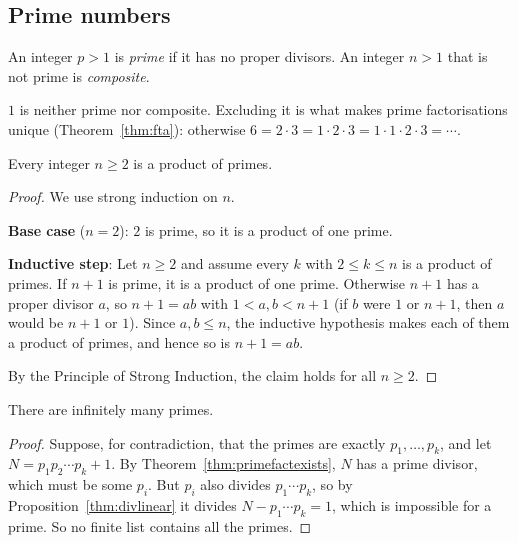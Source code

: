 \subsection{Prime numbers}
\label{sec:7-2}

\begin{definition}
An integer $p>1$ is \emph{prime} if it has no proper divisors. An integer $n>1$ that is not prime is \emph{composite}.
\end{definition}

\begin{note}[$1$ is neither]
$1$ is neither prime nor composite. Excluding it is what makes prime factorisations unique (Theorem~\ref{thm:fta}): otherwise $6=2\cdot3=1\cdot2\cdot3=1\cdot1\cdot2\cdot3=\cdots$.
\end{note}

\begin{theorem}
\label{thm:primefactexists}
Every integer $n\ge2$ is a product of primes.
\end{theorem}
\begin{proof}
We use strong induction on $n$.

\textbf{Base case} ($n=2$): $2$ is prime, so it is a product of one prime.

\textbf{Inductive step}: Let $n\ge2$ and assume every $k$ with $2\le k\le n$ is a product of primes. If $n+1$ is prime, it is a product of one prime. Otherwise $n+1$ has a proper divisor $a$, so $n+1=ab$ with $1<a,b<n+1$ (if $b$ were $1$ or $n+1$, then $a$ would be $n+1$ or $1$). Since $a,b\le n$, the inductive hypothesis makes each of them a product of primes, and hence so is $n+1=ab$.

By the Principle of Strong Induction, the claim holds for all $n\ge2$.
\end{proof}

\bigskip
\begin{theorem}
\label{thm:infprimes}
There are infinitely many primes.
\end{theorem}
\begin{proof}
Suppose, for contradiction, that the primes are exactly $p_1,\dots,p_k$, and let $N=p_1p_2\cdots p_k+1$. By Theorem~\ref{thm:primefactexists}, $N$ has a prime divisor, which must be some $p_i$. But $p_i$ also divides $p_1\cdots p_k$, so by Proposition~\ref{thm:divlinear} it divides $N-p_1\cdots p_k=1$, which is impossible for a prime. So no finite list contains all the primes.
\end{proof}


